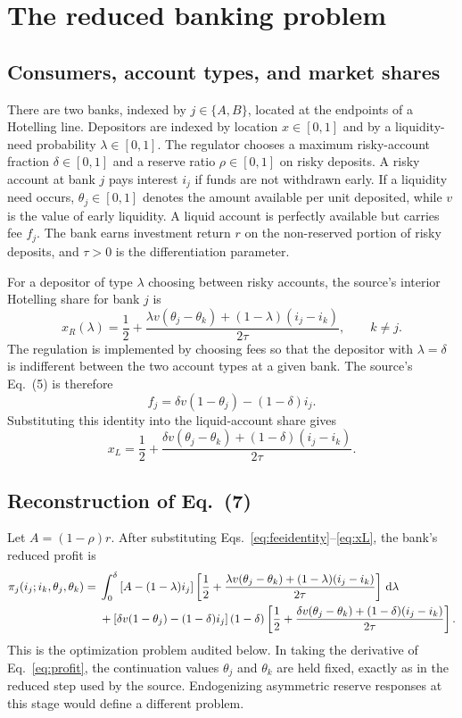 \section{The reduced banking problem}
\subsection{Consumers, account types, and market shares}
There are two banks, indexed by $j\in\{A,B\}$, located at the endpoints of a Hotelling line. Depositors are indexed by location $x\in[0,1]$ and by a liquidity-need probability $\lambda\in[0,1]$. The regulator chooses a maximum risky-account fraction $\delta\in[0,1]$ and a reserve ratio $\rho\in[0,1]$ on risky deposits. A risky account at bank $j$ pays interest $i_j$ if funds are not withdrawn early. If a liquidity need occurs, $\theta_j\in[0,1]$ denotes the amount available per unit deposited, while $v$ is the value of early liquidity. A liquid account is perfectly available but carries fee $f_j$. The bank earns investment return $r$ on the non-reserved portion of risky deposits, and $\tau>0$ is the differentiation parameter.

For a depositor of type $\lambda$ choosing between risky accounts, the source's interior Hotelling share for bank $j$ is
\begin{equation}\label{eq:xR}
 x_R(\lambda)=\frac12+\frac{\lambda v(\theta_j-\theta_k)+(1-\lambda)(i_j-i_k)}{2\tau},\qquad k\neq j.
\end{equation}
The regulation is implemented by choosing fees so that the depositor with $\lambda=\delta$ is indifferent between the two account types at a given bank. The source's Eq.~(5) is therefore
\begin{equation}\label{eq:feeidentity}
 f_j=\delta v(1-\theta_j)-(1-\delta)i_j.
\end{equation}
Substituting this identity into the liquid-account share gives
\begin{equation}\label{eq:xL}
 x_L=\frac12+\frac{\delta v(\theta_j-\theta_k)+(1-\delta)(i_j-i_k)}{2\tau}.
\end{equation}

\subsection{Reconstruction of Eq.~(7)}
Let $A=(1-\rho)r$. After substituting Eqs.~\eqref{eq:feeidentity}--\eqref{eq:xL}, the bank's reduced profit is
\begin{align}
\pi_j(i_j;i_k,\theta_j,\theta_k)
={}&\int_0^\delta \left[A-(1-\lambda)i_j\right]
\left[\frac12+\frac{\lambda v(\theta_j-\theta_k)+(1-\lambda)(i_j-i_k)}{2\tau}\right]\,\mathrm d\lambda \notag\\
&+\left[\delta v(1-\theta_j)-(1-\delta)i_j\right](1-\delta)
\left[\frac12+\frac{\delta v(\theta_j-\theta_k)+(1-\delta)(i_j-i_k)}{2\tau}\right].
\label{eq:profit}
\end{align}
This is the optimization problem audited below. In taking the derivative of Eq.~\eqref{eq:profit}, the continuation values $\theta_j$ and $\theta_k$ are held fixed, exactly as in the reduced step used by the source. Endogenizing asymmetric reserve responses at this stage would define a different problem.

